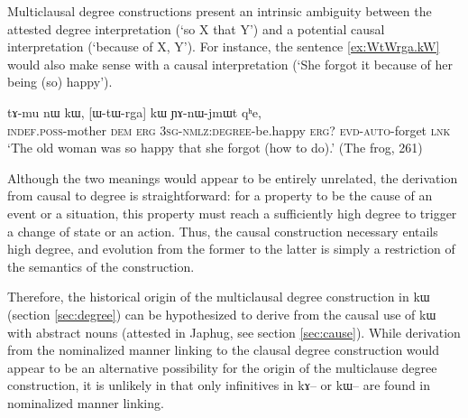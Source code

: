\documentclass[oldfontcommands,oneside,a4paper,11pt]{article}
\newcommand{\ipa}[1]{{\phon #1}} %
\begin{document}
Multiclausal degree constructions  present an intrinsic ambiguity between the attested degree interpretation (`so X that Y') and a potential causal interpretation (`because of X, Y').  For instance, the sentence \ref{ex:WtWrga.kW} would also make sense  with a causal interpretation (`She forgot it because of her being (so) happy').



 \begin{exe} 
 \ex \label{ex:WtWrga.kW}
\gll 
\ipa{tɤ-mu}  	\ipa{nɯ}  	\ipa{kɯ,}  	  	[\ipa{ɯ-tɯ-rga}]  	\ipa{kɯ}  	\ipa{ɲɤ-nɯ-jmɯt}  	\ipa{qʰe,}  \\
\textsc{indef.poss}-mother \textsc{dem} \textsc{erg} \textsc{3sg-nmlz:degree}-be.happy \textsc{erg?} \textsc{evd-auto}-forget  \textsc{lnk} \\
\glt `The old woman was so happy that she forgot (how to do).' (The frog, 261)
 \end{exe} 
 
 

% 
 

Although the two meanings would appear to be entirely unrelated, the derivation from causal to degree is straightforward: for a property to be the cause of an event or a situation, this property must reach a sufficiently high degree to trigger a change of state or an action. Thus,  the causal construction necessary entails high degree, and evolution from the former to the latter is simply a restriction of the semantics of the construction.

Therefore, the historical origin of the multiclausal   degree construction in \ipa{kɯ}   (section \ref{sec:degree})   can be hypothesized to derive  from  the causal use of \ipa{kɯ}   with abstract nouns (attested in Japhug, see section \ref{sec:cause}). While derivation from the nominalized manner linking to the clausal degree construction would appear to be an alternative possibility for the origin of the multiclause degree construction, it is unlikely in that only infinitives in \ipa{kɤ--} or \ipa{kɯ--} are found in nominalized manner linking.  
\end{document}
